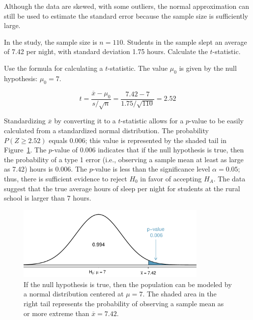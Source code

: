 \begin{spacing}{1.5}
Although the data are skewed, with some outliers, the normal approximation can still be used to estimate the standard error because the sample size is sufficiently large. 

\begin{example}{In the study, the sample size is $n = 110$. Students in the sample slept an average of 7.42 per night, with standard deviation 1.75 hours. Calculate the $t$-statistic.}
		
Use the formula for calculating a $t$-statistic. The value $\mu_{0}$ is given by the null hypothesis: $\mu_{0} = 7$. 

\[t=\frac{\overline{x}-\mu_0}{s/\sqrt{n}} = \frac{7.42 - 7}{1.75 / \sqrt{110}} = 2.52\]

\end{example}

Standardizing $\overline{x}$ by converting it to a $t$-statistic allows for a $p$-value to be easily calculated from a standardized normal distribution. The probability $P(Z \geq 2.52)$ equals 0.006; this value is represented by the shaded tail in Figure~\ref{pValueOneSidedSleepStudy}. The $p$-value of 0.006 indicates that if the null hypothesis is true, then the probability of a type 1 error (i.e., observing a sample mean at least as large as 7.42) hours is 0.006. The $p$-value is less than the significance level $\alpha = 0.05$; thus, there is sufficient evidence to reject $H_0$ in favor of accepting $H_A$. The data suggest that the true average hours of sleep per night for students at the rural school is larger than 7 hours. 

\begin{figure}[hht]
	\centering
	\includegraphics[width=0.83\textwidth]{ch_inference_foundations_oi_biostat/figures/pValueOneSidedSleepStudy/pValueOneSidedSleepStudy}
	\caption{If the null hypothesis is true, then the population can be modeled by a normal distribution centered at $\mu = 7$. The shaded area in the right tail represents the probability of observing a sample mean as or more extreme than $\overline{x} = 7.42$.} 
	\label{pValueOneSidedSleepStudy}
\end{figure}


\end{spacing}
